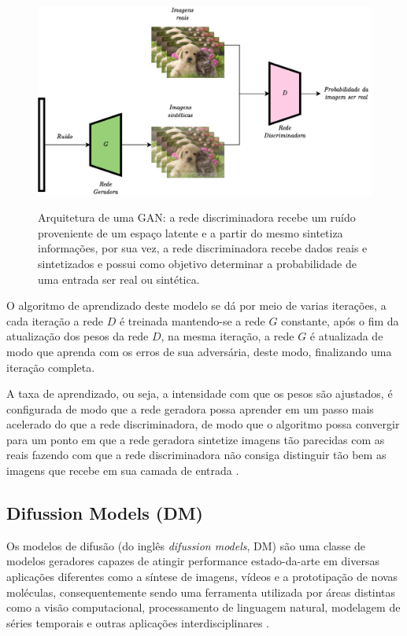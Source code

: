 \begin{figure}[htbp]
	\centering
	\caption[Arquitetura de uma GAN]{Arquitetura de uma GAN: a rede discriminadora recebe um ruído proveniente de um espaço latente e a partir do mesmo sintetiza informações, por sua vez, a rede discriminadora recebe dados reais e sintetizados e possui como objetivo determinar a probabilidade de uma entrada ser real ou sintética.}
		\includegraphics[scale=.25]{imagens/gan.png}
	\label{fig:gan}
\end{figure}

O algoritmo de aprendizado deste modelo se dá por meio de varias iterações, a cada iteração a rede $D$ é treinada mantendo-se a rede $G$ constante, após o fim da atualização dos pesos da rede $D$, na mesma iteração, a rede $G$ é atualizada de modo que aprenda com os erros de sua adversária, deste modo, finalizando uma iteração completa.

A taxa de aprendizado, ou seja, a intensidade com que os pesos são ajustados, é configurada de modo que a rede geradora possa aprender em um passo mais acelerado do que a rede discriminadora, de modo que o algoritmo possa convergir para um ponto em que a rede geradora sintetize imagens tão parecidas com as reais fazendo com que a rede discriminadora não consiga distinguir tão bem as imagens que recebe em sua camada de entrada \cite{goodfellowGenerativeAdversarialNetworks2014}.

\subsection{Difussion Models (DM)}

Os modelos de difusão (do inglês \textit{difussion models}, DM) são uma classe de modelos geradores capazes de atingir performance estado-da-arte em diversas aplicações diferentes como a síntese de imagens, vídeos e a prototipação de novas moléculas, consequentemente sendo uma ferramenta utilizada por áreas distintas como a visão computacional, processamento de linguagem natural, modelagem de séries temporais e outras aplicações interdisciplinares \cite{yangDiffusionModelsComprehensive2023}.

